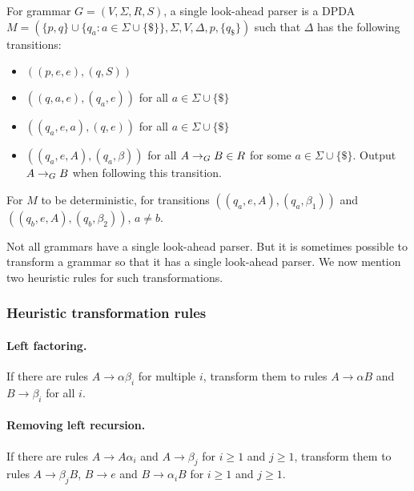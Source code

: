 \begin{definition}
For grammar $G = (V, \Sigma, R, S)$, a single look-ahead parser is a DPDA
$M = (\{p, q\}\cup\{q_a: a \in \Sigma \cup \{\$\}\}, \Sigma, V, \Delta, p, \{q_{\$}\})$
such that $\Delta$ has the following transitions:
\begin{itemize}
\item $((p, e, e), (q, S))$
\item $((q, a, e), (q_a, e))$ for all $a \in \Sigma \cup \{\$\}$
\item $((q_a, e, a), (q, e))$ for all $a \in \Sigma \cup \{\$\}$
\item $((q_a, e, A), (q_a, \beta))$ for all $A \rightarrow_{G} B \in R$ for some $a \in \Sigma \cup \{\$\}$.
    Output $A \rightarrow_{G} B$ when following this transition.
\end{itemize}
For $M$ to be deterministic, for transitions $((q_a, e, A), (q_a, \beta_1))$
and $((q_b, e, A), (q_b, \beta_2))$, $a \neq b$.
\end{definition}

Not all grammars have a single look-ahead parser.
But it is sometimes possible to transform a grammar so that it has a single look-ahead parser.
We now mention two heuristic rules for such transformations.

\subsubsection{Heuristic transformation rules}

\paragraph{Left factoring.}
If there are rules $A \rightarrow \alpha\beta_i$ for multiple $i$,
transform them to rules $A \rightarrow \alpha B$ and $B \rightarrow \beta_i$ for all $i$.

\paragraph{Removing left recursion.}
If there are rules $A \rightarrow A\alpha_i$ and $A \rightarrow \beta_j$
for $i \ge 1$ and $j \ge 1$,
transform them to rules $A \rightarrow \beta_jB$, $B \rightarrow e$ and $B \rightarrow \alpha_iB$
for $i \ge 1$ and $j \ge 1$.


